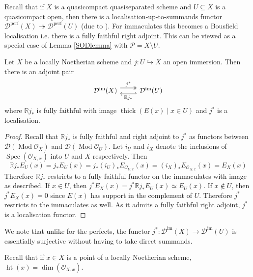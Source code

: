 \documentclass[12pt,oneside]{amsart}
\DeclareMathOperator{\thick}{thick}
\DeclareMathOperator{\Mod}{Mod}
\DeclareMathOperator{\perf}{perf}
\DeclareMathOperator{\immac}{im}
\DeclareMathOperator{\hgt}{ht}
\DeclareMathOperator{\Spec}{Spec}
\begin{document}
Recall that if $X$ is a quasicompact quasiseparated scheme and $U\subseteq X$ is a quasicompact open, then there is a localisation-up-to-summands functor $\mathcal{D}^{\perf}(X) \twoheadrightarrow \mathcal{D}^{\perf}(U)$ (due to \cite{TT90}). For immaculates this becomes a Bousfield localisation i.e. there is a fully faithful right adjoint. This can be viewed as a special case of Lemma \ref{SODlemma} with $\mathcal{P} = X \setminus U$.

\begin{prop} Let $X$ be a locally Noetherian scheme and $j:U \hookrightarrow X$ an open immersion. Then there is an adjoint pair
\[
\begin{tikzcd}
\mathcal{D}^{\immac}(X) \arrow[r,two heads,shift left = 1ex,"j^\ast"] & \arrow[l,hook',shift left = 1ex,"\mathbb{R}j_\ast"] \mathcal{D}^{\immac}(U)
\end{tikzcd}
\]
where $\mathbb{R}j_\ast$ is fully faithful with image $\thick(E(x)\mid x \in U)$ and $j^\ast$ is a localisation.
\end{prop}

\begin{proof}
Recall that $\mathbb{R}j_\ast$ is fully faithful and right adjoint to $j^\ast$ as functors between $\mathcal{D}(\Mod \mathcal{O}_X)$ and $\mathcal{D}(\Mod \mathcal{O}_U)$. Let $i_U$ and $i_X$ denote the inclusions of $\Spec(\mathcal{O}_{X,x})$ into $U$ and $X$ respectively. Then 
\[
\mathbb{R}j_\ast E_U(x) = j_\ast E_U(x) = j_\ast (i_U)_{\ast} E_{\mathcal{O}_{U,x}}(x) = (i_X)_{\ast} E_{\mathcal{O}_{X,x}}(x) = E_X(x)
\]
Therefore $\mathbb{R}j_\ast$ restricts to a fully faithful functor on the immaculates with image as described. If $x \in U$, then $j^\ast E_X(x) = j^\ast \mathbb{R}j_\ast E_U(x) \simeq E_U(x)$. If $x \not\in U$, then $j^\ast E_X(x) = 0$ since $E(x)$ has support in the complement of $U$. Therefore $j^\ast$ restricts to the immaculates as well. As it admits a fully faithful right adjoint, $j^\ast$ is a localisation functor. 
\end{proof}

\begin{remark}
We note that unlike for the perfects, the functor $j^\ast: \mathcal{D}^{\immac}(X) \to \mathcal{D}^{\immac}(U)$ is essentially surjective without having to take direct summands. 
\end{remark}



Recall that if $x \in X$ is a point of a locally Noetherian scheme, $\hgt(x) =  \dim(\mathcal{O}_{X,x})$. 
\end{document}
